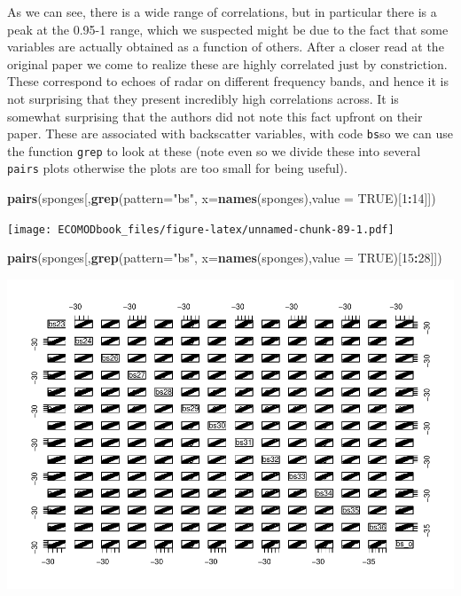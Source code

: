 \documentclass[
]{book}
\newenvironment{Shaded}{\begin{snugshade}}{\end{snugshade}}
\newcommand{\AttributeTok}[1]{\textcolor[rgb]{0.13,0.29,0.53}{#1}}
\newcommand{\ConstantTok}[1]{\textcolor[rgb]{0.56,0.35,0.01}{#1}}
\newcommand{\DecValTok}[1]{\textcolor[rgb]{0.00,0.00,0.81}{#1}}
\newcommand{\FunctionTok}[1]{\textcolor[rgb]{0.13,0.29,0.53}{\textbf{#1}}}
\newcommand{\NormalTok}[1]{#1}
\newcommand{\SpecialCharTok}[1]{\textcolor[rgb]{0.81,0.36,0.00}{\textbf{#1}}}
\newcommand{\StringTok}[1]{\textcolor[rgb]{0.31,0.60,0.02}{#1}}
\begin{document}
As we can see, there is a wide range of correlations, but in particular there is a peak at the 0.95-1 range, which we suspected might be due to the fact that some variables are actually obtained as a function of others. After a closer read at the original paper we come to realize these are highly correlated just by constriction. These correspond to echoes of radar on different frequency bands, and hence it is not surprising that they present incredibly high correlations across. It is somewhat surprising that the authors did not note this fact upfront on their paper. These are associated with backscatter variables, with code \texttt{bs}so we can use the function \texttt{grep} to look at these (note even so we divide these into several \texttt{pairs} plots otherwise the plots are too small for being useful).

\begin{Shaded}
\begin{Highlighting}[]
\FunctionTok{pairs}\NormalTok{(sponges[,}\FunctionTok{grep}\NormalTok{(}\AttributeTok{pattern=}\StringTok{"bs"}\NormalTok{, }\AttributeTok{x=}\FunctionTok{names}\NormalTok{(sponges),}\AttributeTok{value =} \ConstantTok{TRUE}\NormalTok{)[}\DecValTok{1}\SpecialCharTok{:}\DecValTok{14}\NormalTok{]])}
\end{Highlighting}
\end{Shaded}

\texttt{[image: ECOMODbook\_files/figure-latex/unnamed-chunk-89-1.pdf]}

\begin{Shaded}
\begin{Highlighting}[]
\FunctionTok{pairs}\NormalTok{(sponges[,}\FunctionTok{grep}\NormalTok{(}\AttributeTok{pattern=}\StringTok{"bs"}\NormalTok{, }\AttributeTok{x=}\FunctionTok{names}\NormalTok{(sponges),}\AttributeTok{value =} \ConstantTok{TRUE}\NormalTok{)[}\DecValTok{15}\SpecialCharTok{:}\DecValTok{28}\NormalTok{]])}
\end{Highlighting}
\end{Shaded}

\includegraphics{ECOMODbook_files/figure-latex/unnamed-chunk-89-2.pdf}
\end{document}
